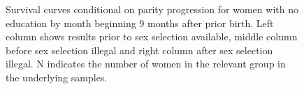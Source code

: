 \documentclass[12pt,letterpaper]{article}
\begin{document}
\begin{figure}[htpb]
{\begin{minipage}{0.31\textwidth}
        \captionsetup[subfigure]{labelformat=empty,position=top,captionskip=-1pt,farskip=-0.5pt}
        \captionsetup[subfigure]{labelformat=parens}
    \end{minipage}
}
\caption{Survival curves conditional on parity progression
for women with no education by month beginning 9 months after prior birth.
Left column shows results prior to sex selection available, middle column before
sex selection illegal and right column after sex selection illegal.
N indicates the number of women in the relevant group in the underlying samples.
}
\label{fig:results_spell3_low_pps}
\end{figure}





\end{document}

